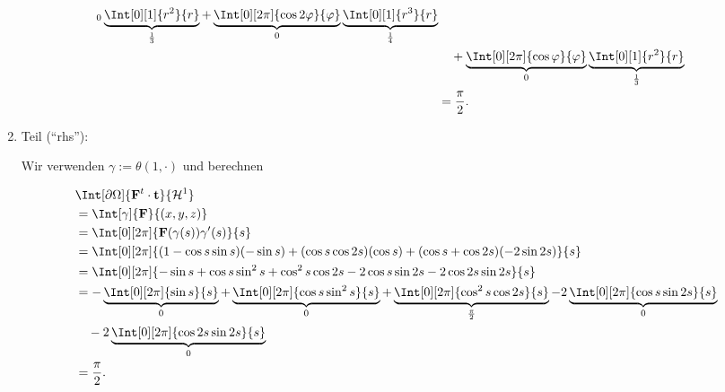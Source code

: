 \begin{solution}
\begin{enumerate}[label = \arabic*.]
\begin{align*}
{        }_0
        \underbrace
        {
            \Int[0][1]
            {
                r^2
            }{r}
        }_\frac{1}{3}
        +
        \underbrace
        {
            \Int[0][2 \pi]
            {
                \cos{2 \varphi}
            }{\varphi}
        }_0
        \underbrace
        {
            \Int[0][1]
            {
                r^3
            }{r}
        }_\frac{1}{4} \\
        & \quad
        +
        \underbrace
        {
            \Int[0][2 \pi]
            {
                \cos \varphi
            }{\varphi}
        }_0
        \underbrace
        {
            \Int[0][1]
            {
                r^2
            }{r}
        }_\frac{1}{3} \\
        & =
        \frac{\pi}{2}.
    \end{align*}
    
    \item Teil (\enquote{rhs}):

    Wir verwenden $\gamma := \theta(1, \cdot)$ und berechnen

    \begin{align*}
        &
        \Int[\partial \Omega]
        {
            \mathbf F^t \cdot \mathbf t
        }{
            \mathcal H^1
        } \\
        & =
        \Int[\gamma]
        {
            \mathbf F
        }{(x, y, z)} \\
        & =
        \Int[0][2 \pi]
        {
            \mathbf F(\gamma(s)) \gamma^\prime(s)
        }{s} \\
        & =
        \Int[0][2 \pi]
        {
            (1 - \cos s \sin s)  (-\sin s)
            +
            (\cos s \cos{2 s})   (\cos s)
            +
            (\cos s + \cos{2 s}) (-2 \sin{2 s})
        }{s} \\
        & =
        \Int[0][2 \pi]
        {
            -\sin s + \cos s \sin^2 s + \cos^2 s \cos{2 s} - 2 \cos s \sin{2 s} - 2 \cos {2 s} \sin{2 s}
        }{s} \\
        & =
        -
        \underbrace
        {
            \Int[0][2 \pi]
            {
                \sin s
            }{s}
        }_0
        +
        \underbrace
        {
            \Int[0][2 \pi]
            {
                \cos s \sin^2 s
            }{s}
        }_0
        +
        \underbrace
        {
            \Int[0][2 \pi]
            {
                \cos^2 s \cos{2 s}
            }{s}
        }_\frac{\pi}{2}
        -
        2
        \underbrace
        {
            \Int[0][2 \pi]
            {
                \cos s \sin{2 s}
            }{s}
        }_0 \\
        & \quad
        -
        2
        \underbrace
        {
            \Int[0][2 \pi]
            {
                \cos{2 s} \sin{2 s}
            }{s}
        }_0 \\
        & =
        \frac{\pi}{2}.
    \end{align*}

\end{enumerate}

\end{solution}

